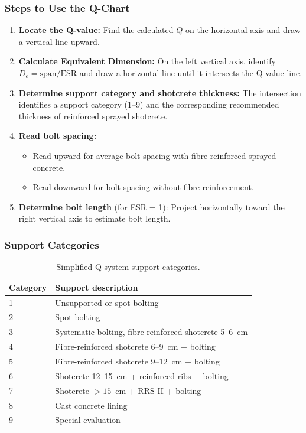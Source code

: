 \documentclass[a4paper,12pt]{article}
\begin{document}
\subsubsection{Steps to Use the Q-Chart}
\begin{enumerate}
    \item \textbf{Locate the Q-value:} Find the calculated $Q$ on the horizontal axis and draw a vertical line upward.
    \item \textbf{Calculate Equivalent Dimension:} On the left vertical axis, identify $D_e = \text{span}/\text{ESR}$ and draw a horizontal line until it intersects the Q-value line.
    \item \textbf{Determine support category and shotcrete thickness:} The intersection identifies a support category (1--9) and the corresponding recommended thickness of reinforced sprayed shotcrete.
    \item \textbf{Read bolt spacing:}
    \begin{itemize}
        \item Read upward for average bolt spacing with fibre-reinforced sprayed concrete.
        \item Read downward for bolt spacing without fibre reinforcement.
    \end{itemize}
    \item \textbf{Determine bolt length} (for ESR = 1): Project horizontally toward the right vertical axis to estimate bolt length.
\end{enumerate}

\subsubsection{Support Categories}

\begin{table}[ht]
\centering
\begin{tabular}{ll}
\toprule
\textbf{Category} & \textbf{Support description} \\
\midrule
1 & Unsupported or spot bolting \\
2 & Spot bolting \\
3 & Systematic bolting, fibre-reinforced shotcrete 5--6~cm \\
4 & Fibre-reinforced shotcrete 6--9~cm + bolting \\
5 & Fibre-reinforced shotcrete 9--12~cm + bolting \\
6 & Shotcrete 12--15~cm + reinforced ribs + bolting \\
7 & Shotcrete $>15$~cm + RRS II + bolting \\
8 & Cast concrete lining \\
9 & Special evaluation \\
\bottomrule
\end{tabular}
\caption{Simplified Q-system support categories.}
\end{table}
\end{document}
